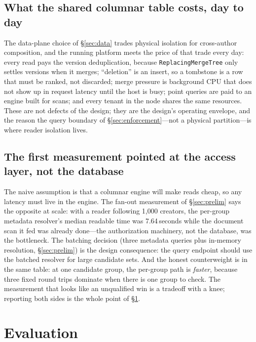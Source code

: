 \documentclass[sigconf, nonacm]{acmart}
\begin{document}
\subsection{What the shared columnar table costs, day to day}

The data-plane choice of \S\ref{sec:data} trades physical isolation for
cross-author composition, and the running platform meets the price of that
trade every day: every read pays the version deduplication, because
\texttt{ReplacingMergeTree} only settles versions when it merges;
``deletion'' is an insert, so a tombstone is a row that must be ranked, not
discarded; merge pressure is background CPU that does not show up in request
latency until the host is busy; point queries are paid to an engine built
for scans; and every tenant in the node shares the same resources. These are
not defects of the design; they are the design's operating envelope, and the
reason the query boundary of \S\ref{sec:enforcement}---not a physical
partition---is where reader isolation lives.

\subsection{The first measurement pointed at the access layer, not the database}

The naive assumption is that a columnar engine will make reads cheap, so any
latency must live in the engine. The fan-out measurement of
\S\ref{sec:prelim} says the opposite at scale: with a reader following
1,000 creators, the per-group metadata resolver's median readable time was
7.64\,seconds while the document scan it fed was already done---the
authorization machinery, not the database, was the bottleneck. The batching
decision (three metadata queries plus in-memory resolution,
\S\ref{sec:prelim}) is the design consequence: the query endpoint should use
the batched resolver for large candidate sets. And the honest counterweight
is in the same table: at one candidate group, the per-group path is
\emph{faster}, because three fixed round trips dominate when there is one
group to check. The measurement that looks like an unqualified win is a
tradeoff with a knee; reporting both sides is the whole point of
\S\ref{sec:method}.

\section{Evaluation}
\label{sec:method}
\end{document}
